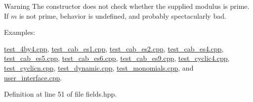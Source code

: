 \begin{DoxyWarning}{Warning}
The constructor does not check whether the supplied modulus is prime. If $m$ is not prime, behavior is undefined, and probably spectacularly bad. 
\end{DoxyWarning}
\begin{Desc}
\item[Examples\+: ]\par
\hyperlink{test_4by4_8cpp-example}{test\+\_\+4by4.\+cpp}, \hyperlink{test_cab_es1_8cpp-example}{test\+\_\+cab\+\_\+es1.\+cpp}, \hyperlink{test_cab_es2_8cpp-example}{test\+\_\+cab\+\_\+es2.\+cpp}, \hyperlink{test_cab_es4_8cpp-example}{test\+\_\+cab\+\_\+es4.\+cpp}, \hyperlink{test_cab_es5_8cpp-example}{test\+\_\+cab\+\_\+es5.\+cpp}, \hyperlink{test_cab_es6_8cpp-example}{test\+\_\+cab\+\_\+es6.\+cpp}, \hyperlink{test_cab_es9_8cpp-example}{test\+\_\+cab\+\_\+es9.\+cpp}, \hyperlink{test_cyclic4_8cpp-example}{test\+\_\+cyclic4.\+cpp}, \hyperlink{test_cyclicn_8cpp-example}{test\+\_\+cyclicn.\+cpp}, \hyperlink{test_dynamic_8cpp-example}{test\+\_\+dynamic.\+cpp}, \hyperlink{test_monomials_8cpp-example}{test\+\_\+monomials.\+cpp}, and \hyperlink{user_interface_8cpp-example}{user\+\_\+interface.\+cpp}.\end{Desc}


Definition at line 51 of file fields.\+hpp.

